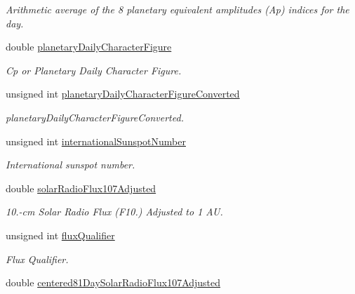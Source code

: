 \begin{DoxyCompactItemize}
\begin{DoxyCompactList}\small\item\em Arithmetic average of the 8 planetary equivalent amplitudes (Ap) indices for the day. \end{DoxyCompactList}\item 
double \hyperlink{structtudat_1_1input__output_1_1solar__activity_1_1SolarActivityData_ac81a017e90b285c6ecc719f2b6a9d0ef}{planetary\+Daily\+Character\+Figure}
\begin{DoxyCompactList}\small\item\em Cp or Planetary Daily Character Figure. \end{DoxyCompactList}\item 
unsigned int \hyperlink{structtudat_1_1input__output_1_1solar__activity_1_1SolarActivityData_aa33e92327423b0d5d5f03446c8c1c6eb}{planetary\+Daily\+Character\+Figure\+Converted}
\begin{DoxyCompactList}\small\item\em planetary\+Daily\+Character\+Figure\+Converted. \end{DoxyCompactList}\item 
unsigned int \hyperlink{structtudat_1_1input__output_1_1solar__activity_1_1SolarActivityData_a59da73b162a15946211ee5a8f21f9551}{international\+Sunspot\+Number}
\begin{DoxyCompactList}\small\item\em International sunspot number. \end{DoxyCompactList}\item 
double \hyperlink{structtudat_1_1input__output_1_1solar__activity_1_1SolarActivityData_aa63a9e4acba47229fced3d67282b3106}{solar\+Radio\+Flux107\+Adjusted}
\begin{DoxyCompactList}\small\item\em 10.-\/cm Solar Radio Flux (F10.) Adjusted to 1 AU. \end{DoxyCompactList}\item 
unsigned int \hyperlink{structtudat_1_1input__output_1_1solar__activity_1_1SolarActivityData_a4ccc6def146e5a92be41d2ff879c22e0}{flux\+Qualifier}
\begin{DoxyCompactList}\small\item\em Flux Qualifier. \end{DoxyCompactList}\item 
double \hyperlink{structtudat_1_1input__output_1_1solar__activity_1_1SolarActivityData_a48e5d6e13c875574c94d1761f625f8c6}{centered81\+Day\+Solar\+Radio\+Flux107\+Adjusted}

\end{DoxyCompactItemize}
